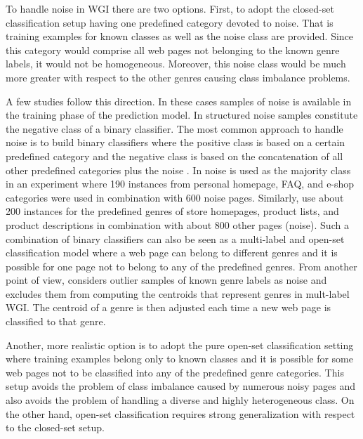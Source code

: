 To handle noise in WGI there are two options. First, to adopt the closed-set classification setup having one predefined category devoted to noise. That is training examples for known classes as well as the noise class are provided. Since this category would comprise all web pages not belonging to the known genre labels, it would not be homogeneous. Moreover, this noise class would be much more greater with respect to the other genres causing class imbalance problems. 

A few studies follow this direction. In these cases samples of noise is available in the training phase of the prediction model. In \parencite{Vidulin2007} structured noise samples constitute the negative class of a binary classifier. The most common approach to handle noise is to build binary classifiers where the positive class is based on a certain predefined category and the negative class is based on the concatenation of all other predefined categories plus the noise . In  noise is used as the majority class in an experiment where 190 instances from personal homepage, FAQ, and e-shop categories were used in combination with 600 noise pages. Similarly,  use about 200 instances for the predefined genres of store homepages, product lists, and product descriptions in combination with about 800 other pages (noise). Such a combination of binary classifiers can also be seen as a multi-label and open-set classification model where a web page can belong to different genres and it is possible for one page not to belong to any of the predefined genres. From another point of view,  considers outlier samples of known genre labels as noise and excludes them from computing the centroids that represent genres in mult-label WGI. The centroid of a genre is then adjusted each time a new web page is classified to that genre. 

Another, more realistic option is to adopt the pure open-set classification setting where training examples belong only to known classes and it is possible for some web pages not to be classified into any of the predefined genre categories. This setup avoids the problem of class imbalance caused by numerous noisy pages and also avoids the problem of handling a diverse and highly heterogeneous class. On the other hand, open-set classification requires strong generalization with respect to the closed-set setup. 

